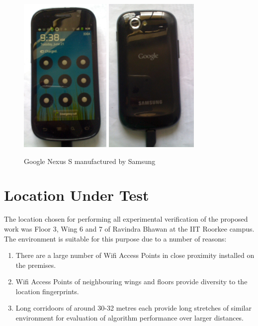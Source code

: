 \begin{figure}
\centering
    \includegraphics[height=3in]{figures/android_front}
    \includegraphics[height=3in]{figures/android_back}
\caption{Google Nexus S manufactured by Samsung}
\end{figure}

\section{Location Under Test}

The location chosen for performing all experimental verification of the
proposed work was Floor 3, Wing 6 and 7 of Ravindra Bhawan at the IIT Roorkee
campus. The environment is suitable for this purpose due to a number of reasons:

\begin{enumerate}
\item There are a large number of Wifi Access Points in close proximity 
    installed on the premises.
\item Wifi Access Points of neighbouring wings and floors provide diversity
    to the location fingerprints.
\item Long corridoors of around 30-32 metres each provide long stretches of
    similar environment for evaluation of algorithm performance over larger
    distances.
\end{enumerate}

